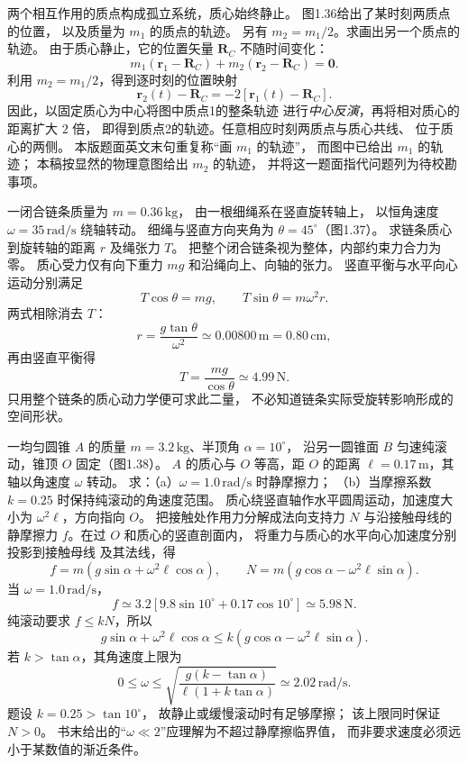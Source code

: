 两个相互作用的质点构成孤立系统，质心始终静止。
图1.36给出了某时刻两质点的位置，
以及质量为 $m_1$ 的质点的轨迹。
另有 $m_2=m_1/2$。求画出另一个质点的轨迹。
\exsolution
由于质心静止，它的位置矢量 $\bm R_C$ 不随时间变化：
\[
m_1(\bm r_1-\bm R_C)+
m_2(\bm r_2-\bm R_C)=\bm0.
\]
利用 $m_2=m_1/2$，得到逐时刻的位置映射
\[
\boxed{\bm r_2(t)-\bm R_C
=-2[\bm r_1(t)-\bm R_C]}.
\]
因此，以固定质心为中心将图中质点1的整条轨迹
进行\emph{中心反演}，再将相对质心的距离扩大 $2$ 倍，
即得到质点2的轨迹。任意相应时刻两质点与质心共线、
位于质心的两侧。
\excheck 本版题面英文末句重复称“画 $m_1$ 的轨迹”，
而图中已给出 $m_1$ 的轨迹；
本稿按显然的物理意图给出 $m_2$ 的轨迹，
并将这一题面指代问题列为待校勘事项。

一闭合链条质量为 $m=0.36\,\mathrm{kg}$，
由一根细绳系在竖直旋转轴上，
以恒角速度 $\omega=35\,\mathrm{rad/s}$ 绕轴转动。
细绳与竖直方向夹角为 $\theta=45^\circ$（图1.37）。
求链条质心到旋转轴的距离 $r$ 及绳张力 $T$。
\exsolution
把整个闭合链条视为整体，内部约束力合力为零。
质心受力仅有向下重力 $mg$ 和沿绳向上、向轴的张力。
竖直平衡与水平向心运动分别满足
\[
T\cos\theta=mg,\qquad
T\sin\theta=m\omega^2r.
\]
两式相除消去 $T$：
\[
\boxed{r=\frac{g\tan\theta}{\omega^2}
\simeq0.00800\,\mathrm m=0.80\,\mathrm{cm}},
\]
再由竖直平衡得
\[
\boxed{T=\frac{mg}{\cos\theta}
\simeq4.99\,\mathrm N}.
\]
\excheck 只用整个链条的质心动力学便可求此二量，
不必知道链条实际受旋转影响形成的空间形状。

一均匀圆锥 $A$ 的质量
$m=3.2\,\mathrm{kg}$、半顶角 $\alpha=10^\circ$，
沿另一圆锥面 $B$ 匀速纯滚动，锥顶 $O$ 固定（图1.38）。
$A$ 的质心与 $O$ 等高，距 $O$ 的距离
$\ell=0.17\,\mathrm m$，其轴以角速度 $\omega$ 转动。
求：（a）$\omega=1.0\,\mathrm{rad/s}$ 时静摩擦力；
（b）当摩擦系数 $k=0.25$ 时保持纯滚动的角速度范围。
\exsolution
质心绕竖直轴作水平圆周运动，加速度大小为
$\omega^2\ell$，方向指向 $O$。
把接触处作用力分解成法向支持力 $N$ 与沿接触母线的
静摩擦力 $f$。在过 $O$ 和质心的竖直剖面内，
将重力与质心的水平向心加速度分别投影到接触母线
及其法线，得
\[
\boxed{f=m(g\sin\alpha+\omega^2\ell\cos\alpha)},\qquad
\boxed{N=m(g\cos\alpha-\omega^2\ell\sin\alpha)}.
\]
当 $\omega=1.0\,\mathrm{rad/s}$，
\[
\boxed{f\simeq
3.2[9.8\sin10^\circ+0.17\cos10^\circ]
\simeq5.98\,\mathrm N}.
\]
纯滚动要求 $f\le kN$，所以
\[
g\sin\alpha+\omega^2\ell\cos\alpha
\le k(g\cos\alpha-\omega^2\ell\sin\alpha).
\]
若 $k>\tan\alpha$，其角速度上限为
\[
\boxed{0\le\omega\le
\sqrt{\frac{g(k-\tan\alpha)}
{\ell(1+k\tan\alpha)}}\simeq2.02\,\mathrm{rad/s}}.
\]
\excheck 题设 $k=0.25>\tan10^\circ$，
故静止或缓慢滚动时有足够摩擦；
该上限同时保证 $N>0$。
书末给出的“$\omega\ll2$”应理解为不超过静摩擦临界值，
而非要求速度必须远小于某数值的渐近条件。

